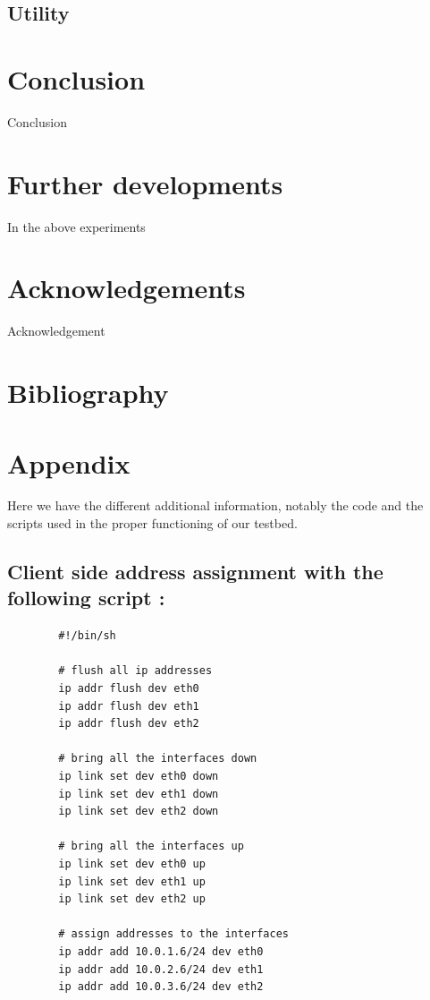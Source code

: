 \documentclass[a4paper,11pt]{article}
\begin{document}
		\subsection{Utility}
			\label{subsec:utility}

	\clearpage
	\section{Conclusion}
		\label{sec:conclusion}
	 	Conclusion
		 	
		 
	\clearpage
	\section{Further developments}
		\label{sec:furtherdevelopment}
		In the above experiments 
			
		 	
		 	
	\clearpage
	\section{Acknowledgements}
	 
	  	Acknowledgement
		 
 	\clearpage
 	\section{Bibliography}
		
		


	\clearpage
	\section{Appendix}
		\label{sec:appendix}
	 	Here we have the different additional information, notably the code and the scripts used in the proper functioning of our testbed.

	 	\subsection{Client side address assignment with the following script :}
	 	\label{subsec:clientaddress}
	 	\begin{lstlisting}
	 	#!/bin/sh

	 	# flush all ip addresses
	 	ip addr flush dev eth0
	 	ip addr flush dev eth1
	 	ip addr flush dev eth2

	 	# bring all the interfaces down
	 	ip link set dev eth0 down
	 	ip link set dev eth1 down
	 	ip link set dev eth2 down

	 	# bring all the interfaces up
	 	ip link set dev eth0 up
	 	ip link set dev eth1 up
	 	ip link set dev eth2 up

	 	# assign addresses to the interfaces
	 	ip addr add 10.0.1.6/24 dev eth0
	 	ip addr add 10.0.2.6/24 dev eth1
	 	ip addr add 10.0.3.6/24 dev eth2
	 	\end{lstlisting}
\end{document}
